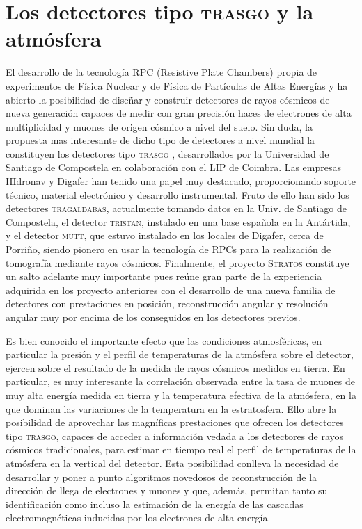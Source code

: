 \documentclass[a4paper]{article}
\begin{document}
\section{Los detectores tipo  \textsc{trasgo} y la atmósfera}

El desarrollo de la tecnología RPC (Resistive Plate Chambers) propia de experimentos de Física Nuclear  y de Física de Partículas de Altas Energías y ha abierto la posibilidad de diseñar y construir detectores de rayos cósmicos de nueva generación capaces de medir con gran precisión haces de electrones de alta multiplicidad y muones de origen cósmico a nivel del suelo. Sin duda, la propuesta mas interesante de dicho tipo de detectores a nivel mundial la constituyen los detectores tipo \textsc{trasgo} \cite{jag, moscu}, desarrollados por la Universidad de Santiago de Compostela en colaboración con el LIP de Coimbra.  Las empresas HIdronav  y Digafer han tenido una papel muy  destacado, proporcionando soporte técnico, material electrónico y desarrollo instrumental. Fruto de ello han sido los detectores \textsc{tragaldabas}, actualmente tomando datos en la Univ. de Santiago de Compostela, el detector \textsc{tristan}, instalado en una base española en la Antártida, y el detector \textsc{mutt}, que estuvo instalado en los locales de Digafer, cerca de Porriño, siendo pionero en usar la tecnología de RPCs para la realización de tomografía mediante rayos cósmicos. Finalmente, el proyecto \textsc{Stratos} constituye un salto adelante muy importante pues reúne gran parte de la experiencia adquirida en los proyecto anteriores con el desarrollo de una nueva familia de detectores con prestaciones en posición, reconstrucción angular y resolución angular muy por encima de los conseguidos en los detectores previos.

Es bien conocido el importante efecto que las condiciones atmosféricas, en particular la presión y el perfil de temperaturas de la atmósfera sobre el detector, ejercen sobre el resultado de la  medida de rayos cósmicos medidos en tierra. En particular, es muy interesante la correlación observada entre la tasa de muones de muy alta energía medida en tierra y la temperatura efectiva de la atmósfera, en la que dominan las variaciones de la temperatura en la estratosfera. Ello abre la posibilidad de aprovechar las magníficas prestaciones que ofrecen los detectores tipo \textsc{trasgo}, capaces de acceder a información vedada a los detectores de rayos cósmicos tradicionales, para estimar en tiempo real el perfil de temperaturas de la atmósfera en la vertical del detector. 
Esta posibilidad conlleva la necesidad de desarrollar y poner a punto algoritmos novedosos de reconstrucción de la dirección de llega de electrones y muones y que, además, permitan tanto su identificación como incluso la estimación de la energía de las cascadas electromagnéticas inducidas por los electrones de alta energía.
\end{document}
